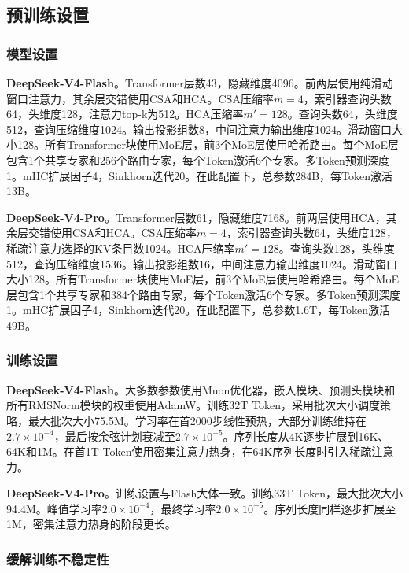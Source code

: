 \documentclass[11pt,a4paper]{article}
\newcommand{\dsvfourpro}{DeepSeek-V4-Pro}
\newcommand{\dsvfourflash}{DeepSeek-V4-Flash}
\newcommand{\moe}{MoE}
\begin{document}
\subsection{预训练设置}

\subsubsection{模型设置}

\textbf{\dsvfourflash}。Transformer层数43，隐藏维度4096。前两层使用纯滑动窗口注意力，其余层交错使用CSA和HCA。CSA压缩率\(m=4\)，索引器查询头数64，头维度128，注意力top-k为512。HCA压缩率\(m'=128\)。查询头数64，头维度512，查询压缩维度1024。输出投影组数8，中间注意力输出维度1024。滑动窗口大小128。所有Transformer块使用\moe{}层，前3个\moe{}层使用哈希路由。每个\moe{}层包含1个共享专家和256个路由专家，每个Token激活6个专家。多Token预测深度1。mHC扩展因子4，Sinkhorn迭代20。在此配置下，总参数284B，每Token激活13B。

\textbf{\dsvfourpro}。Transformer层数61，隐藏维度7168。前两层使用HCA，其余层交错使用CSA和HCA。CSA压缩率\(m=4\)，索引器查询头数64，头维度128，稀疏注意力选择的KV条目数1024。HCA压缩率\(m'=128\)。查询头数128，头维度512，查询压缩维度1536。输出投影组数16，中间注意力输出维度1024。滑动窗口大小128。所有Transformer块使用\moe{}层，前3个\moe{}层使用哈希路由。每个\moe{}层包含1个共享专家和384个路由专家，每个Token激活6个专家。多Token预测深度1。mHC扩展因子4，Sinkhorn迭代20。在此配置下，总参数1.6T，每Token激活49B。

\subsubsection{训练设置}

\textbf{\dsvfourflash}。大多数参数使用Muon优化器，嵌入模块、预测头模块和所有RMSNorm模块的权重使用AdamW。训练32T Token，采用批次大小调度策略，最大批次大小75.5M。学习率在首2000步线性预热，大部分训练维持在\(2.7 \times 10^{-4}\)，最后按余弦计划衰减至\(2.7 \times 10^{-5}\)。序列长度从4K逐步扩展到16K、64K和1M。在首1T Token使用密集注意力热身，在64K序列长度时引入稀疏注意力。

\textbf{\dsvfourpro}。训练设置与Flash大体一致。训练33T Token，最大批次大小94.4M。峰值学习率\(2.0 \times 10^{-4}\)，最终学习率\(2.0 \times 10^{-5}\)。序列长度同样逐步扩展至1M，密集注意力热身的阶段更长。

\subsubsection{缓解训练不稳定性}
\end{document}
